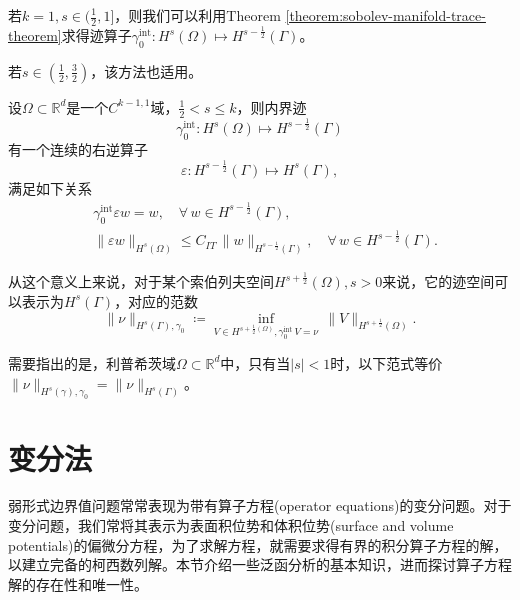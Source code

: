 \begin{lemma}
  若$k=1, s \in ( \frac{1}{2}, 1]$，则我们可以利用Theorem \ref{theorem:sobolev-manifold-trace-theorem}求得迹算子$\gamma_0^{\text{int}} : H^s(\Omega) \mapsto H^{s - \frac{1}{2}}(\Gamma)$。

  若$s \in (\frac{1}{2}, \frac{3}{2})$，该方法也适用\citep[Theorem 3.38]{McLean:2000ta}。
\end{lemma}

\begin{theorem}[索伯列夫空间的逆迹定理]
  \label{theorem:sobolev-manifold-inverse-trace-theorem}
  设$\Omega \subset \mathbb{R}^d$是一个$C^{k-1,1}$域，$\frac{1}{2} < s \le k$，则内界迹
  \begin{equation*}
    \gamma_0^{\text{int}} : H^s(\Omega) \mapsto H^{s - \frac{1}{2}}(\Gamma)
  \end{equation*}
  有一个连续的右逆算子
  \begin{equation*}
    \mathcal{\varepsilon}: H^{s-\frac{1}{2}}(\Gamma) \mapsto H^{s}(\Gamma),
  \end{equation*}
满足如下关系
\begin{equation*}
  \begin{split}
    &\gamma_0^{\text{int}} \mathbb{\varepsilon} w = w, \quad \forall \, w \in H^{s-\frac{1}{2}}(\Gamma), \\
    &\big\| \mathbb{\varepsilon} w \big\|_{H^{s}(\Omega)} \le C_{IT} \, \big\| w \big\|_{H^{s-\frac{1}{2}}(\Gamma)}, \quad \forall \, w \in H^{s-\frac{1}{2}}(\Gamma).
  \end{split}
\end{equation*}
\end{theorem}

\begin{definition}[索伯列夫迹空间]
从这个意义上来说，对于某个索伯列夫空间$H^{s+\frac{1}{2}}(\Omega), s > 0$来说，它的迹空间可以表示为$H^{s}(\Gamma)$，对应的范数
\begin{equation*}
  \big\| \nu \big\|_{H^s(\Gamma), \gamma_0} \coloneqq
  \inf_{V \in H^{s + \frac{1}{2}(\Omega)}, \gamma_0^{\text{int}} \, V = \nu} \, \big\| V \big\|_{H^{s + \frac{1}{2}}(\Omega)}.
\end{equation*}
\end{definition}

需要指出的是，利普希茨域$\Omega \subset \mathbb{R}^d$中，只有当$|s| <1$时，以下范式等价$\| \nu \|_{H^{s}(\gamma), \gamma_0} = \| \nu \|_{H^{s}(\Gamma)}$。


\section{变分法}
\label{sec:variational-methods}
弱形式边界值问题常常表现为带有算子方程(operator equations)的变分问题。对于变分问题，我们常将其表示为表面积位势和体积位势(surface and volume potentials)的偏微分方程，为了求解方程，就需要求得有界的积分算子方程的解，以建立完备的柯西数列解。本节介绍一些泛函分析的基本知识，进而探讨算子方程解的存在性和唯一性。

